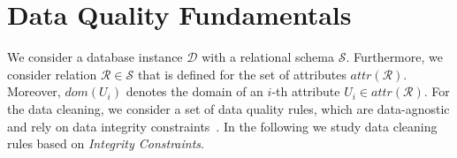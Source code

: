 \section{Data Quality Fundamentals}
\label{sec:expl}



We consider a database instance $\mathcal{D}$ with a relational schema $\mathcal{S}$. Furthermore, we consider relation $\mathcal{R} \in \mathcal{S}$ that is defined for the set of attributes $attr(\mathcal{R})$. Moreover, $dom(U_i)$ denotes the domain of an $i$-th attribute $U_i \in attr(\mathcal{R})$. For the data cleaning, we consider a set of data quality rules, which are data-agnostic and rely on data integrity constraints~\cite{AbiteboulHV95}. In the following we study data cleaning rules based on \emph{Integrity Constraints}.

